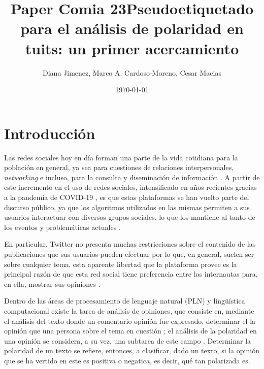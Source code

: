 \documentclass[a4paper]{llncs}
\date{\today}
\title{Paper Comia 23}
\begin{document}
\title{Pseudoetiquetado para el análisis de polaridad en tuits: un primer
    acercamiento}
  \author{Diana Jimenez, Marco A. Cardoso-Moreno, Cesar Macias}



\maketitle


\begin{abstract}



\end{abstract}

\section{Introducción}
\label{sec:orgb0ab483}
Las redes sociales hoy en día forman una parte de la vida cotidiana para la
población en general, ya sea para cuestiones de relaciones interpersonales,
\emph{networking} e incluso, para la consulta y diseminación de información
\cite{improving_sentiment_prediction,tesis_cesar,jtaer18020039}. A partir de
este incremento en el uso de redes sociales, intensificado en años recientes
gracias a la pandemia de COVID-19 \cite{greenhow2021inquiring}, es que estas
plataformas se han vuelto parte del discurso público, ya que los algoritmos
utilizados en las mismas permiten a sus usuarios interactuar con diversos grupos
sociales, lo que los mantiene al tanto de los eventos y problemáticas actuales
\cite{BASTICK2021would_you_notice}.

En particular, Twitter no presenta muchas restricciones sobre el contenido de
las  publicaciones que sus usuarios pueden efectuar por lo que, en general,
suelen ser sobre cualquier tema, esta aparente libertad que la plataforma provee
es la principal razón de que esta red social tiene preferencia entre los
internautas para, en ella, mostrar sus opiniones \cite{tesis_cesar}.

Dentro de las áreas de procesamiento de lenguaje natural (PLN) y lingüística
computacional existe la tarea de análisis de opiniones, que consiste en,
mediante el análisis del texto donde un comentario opinión fue expresado,
determinar el la opinión que una persona sobre el tema en cuestión
\cite{mejova2009sentiment}; el análisis de la polaridad en una opinión se
considera, a su vez, una subtarea de este campo \cite{gambino-2019}. Determinar
la polaridad de un texto se refiere, entonces, a clasificar, dado un texto, si
la opinión que se ha vertido en este es positiva o negatica, es decir, qué tan
polarizada es.
\end{document}
